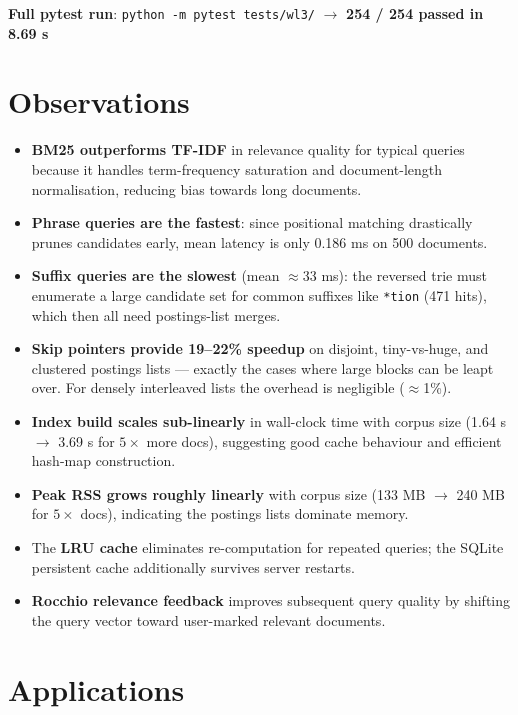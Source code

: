 \documentclass[12pt]{article}
\begin{document}
\noindent\textbf{Full pytest run}: \texttt{python -m pytest tests/wl3/} $\rightarrow$ \textbf{254 / 254 passed in 8.69 s}

\section*{Observations}

\begin{itemize}
    \item \textbf{BM25 outperforms TF-IDF} in relevance quality for typical queries because it handles term-frequency saturation and document-length normalisation, reducing bias towards long documents.
    \item \textbf{Phrase queries are the fastest}: since positional matching drastically prunes candidates early, mean latency is only 0.186 ms on 500 documents.
    \item \textbf{Suffix queries are the slowest} (mean $\approx$33 ms): the reversed trie must enumerate a large candidate set for common suffixes like \texttt{*tion} (471 hits), which then all need postings-list merges.
    \item \textbf{Skip pointers provide 19–22\% speedup} on disjoint, tiny-vs-huge, and clustered postings lists --- exactly the cases where large blocks can be leapt over. For densely interleaved lists the overhead is negligible ($\approx$1\%).
    \item \textbf{Index build scales sub-linearly} in wall-clock time with corpus size (1.64 s $\to$ 3.69 s for $5\times$ more docs), suggesting good cache behaviour and efficient hash-map construction.
    \item \textbf{Peak RSS grows roughly linearly} with corpus size (133 MB $\to$ 240 MB for $5\times$ docs), indicating the postings lists dominate memory.
    \item The \textbf{LRU cache} eliminates re-computation for repeated queries; the SQLite persistent cache additionally survives server restarts.
    \item \textbf{Rocchio relevance feedback} improves subsequent query quality by shifting the query vector toward user-marked relevant documents.
\end{itemize}

\section*{Applications}
\end{document}
